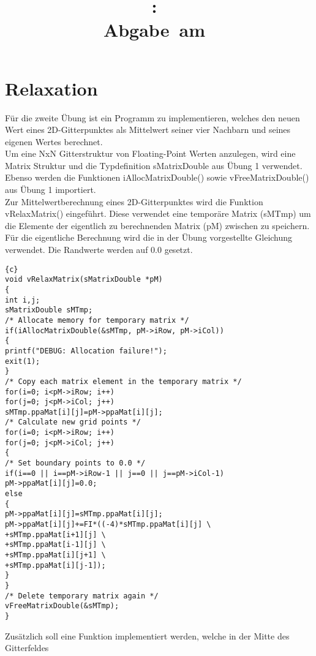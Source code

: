 \documentclass{article}
\title{
\vspace{2in}
\textmd{\textbf{\hmwkClass:\ \hmwkTitle}}\\
\normalsize\vspace{0.1in}\small{Abgabe\ am\ \hmwkDueDate}\\
\vspace{0.1in}\large{\textit{\hmwkClassTime}}
\vspace{3in}
}
\author{\textbf{\hmwkAuthorName}}
\date{} %
\newcommand{\enterProblemHeader}[1]{
}
\newcommand{\exitProblemHeader}[1]{
}
\newcounter{homeworkProblemCounter} %
\newcommand{\homeworkProblemName}{}
\newenvironment{homeworkProblem}[1][Problem \arabic{homeworkProblemCounter}]{ %
\stepcounter{homeworkProblemCounter} %
\renewcommand{\homeworkProblemName}{#1} %
\section{\homeworkProblemName} %
}{
}
\begin{document}
\maketitle
\newpage
\tableofcontents
\newpage
\begin{homeworkProblem}[Relaxation]
Für die zweite Übung ist ein Programm zu implementieren, welches den neuen Wert eines
2D-Gitterpunktes als Mittelwert seiner vier Nachbarn und seines eigenen Wertes berechnet.
\\
Um eine NxN Gitterstruktur von Floating-Point Werten anzulegen, wird eine
Matrix Struktur und die Typdefinition sMatrixDouble aus Übung 1 verwendet. Ebenso
werden die Funktionen iAllocMatrixDouble() sowie vFreeMatrixDouble() aus Übung 1
importiert.
\\
Zur Mittelwertberechnung eines 2D-Gitterpunktes wird die Funktion vRelaxMatrix()
eingeführt. Diese verwendet eine temporäre Matrix (sMTmp) um die Elemente der
eigentlich zu berechnenden Matrix (pM) zwischen zu speichern. Für die eigentliche
Berechnung wird die in der Übung vorgestellte Gleichung verwendet. Die Randwerte
werden auf 0.0 gesetzt.
\begin{lstlisting}{c}
void vRelaxMatrix(sMatrixDouble *pM)
{
int i,j;
sMatrixDouble sMTmp;
/* Allocate memory for temporary matrix */
if(iAllocMatrixDouble(&sMTmp, pM->iRow, pM->iCol))
{
printf("DEBUG: Allocation failure!");
exit(1);
}
/* Copy each matrix element in the temporary matrix */
for(i=0; i<pM->iRow; i++)
for(j=0; j<pM->iCol; j++)
sMTmp.ppaMat[i][j]=pM->ppaMat[i][j];
/* Calculate new grid points */
for(i=0; i<pM->iRow; i++)
for(j=0; j<pM->iCol; j++)
{
/* Set boundary points to 0.0 */
if(i==0 || i==pM->iRow-1 || j==0 || j==pM->iCol-1)
pM->ppaMat[i][j]=0.0;
else
{
pM->ppaMat[i][j]=sMTmp.ppaMat[i][j];
pM->ppaMat[i][j]+=FI*((-4)*sMTmp.ppaMat[i][j] \
+sMTmp.ppaMat[i+1][j] \
+sMTmp.ppaMat[i-1][j] \
+sMTmp.ppaMat[i][j+1] \
+sMTmp.ppaMat[i][j-1]);
}
}
/* Delete temporary matrix again */
vFreeMatrixDouble(&sMTmp);
}
\end{lstlisting}
Zusätzlich soll eine Funktion implementiert werden, welche in der Mitte des Gitterfeldes

\end{homeworkProblem}
\end{document}
